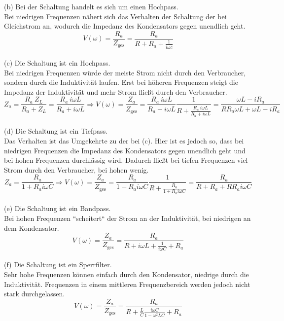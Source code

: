 \documentclass[11pt a4paper]{article}
\begin{document}
(b) Bei der Schaltung handelt es sich um einen Hochpass. \\
Bei niedrigen Frequenzen nähert sich das Verhalten der
Schaltung der bei Gleichstrom an, wodurch die Impedanz des Kondensators gegen unendlich geht.
\[ V(\omega) = \frac{R_a}{Z_\text{ges}} = \frac{R_a}{R + R_a + \frac{1}{i\omega c}} \]
\\

(c) Die Schaltung ist ein Hochpass. \\
Bei niedrigen Frequenzen würde der meiste Strom nicht durch den Verbraucher, sondern durch die Induktivität laufen.
Erst bei höheren Frequenzen steigt die Impedanz der Induktivität und mehr Strom fließt durch den Verbraucher.
\[
	Z_a = \frac{R_a \ Z_L}{R_a + Z_L} = \frac{R_a \ i\omega L}{R_a + i\omega L} 
	\Rightarrow 
	V(\omega) = \frac{Z_a}{Z_\text{ges}} 
	= \frac{R_a \ i\omega L}{R_a + i\omega L} \frac{1}{R + \frac{R_a \ i\omega L}{R_a + i\omega L}}
	= \frac{\omega L - iR_a}{R R_a \omega L + \omega L - iR_a}
\]
\\

(d) Die Schaltung ist ein Tiefpass. \\
Das Verhalten ist das Umgekehrte zu der bei (c). Hier ist es jedoch so, dass bei niedrigen Frequenzen die Impedanz
des Kondensators gegen unendlich geht und bei hohen Frequenzen durchlässig wird. Dadurch fließt bei tiefen
Frequenzen viel Strom durch den Verbraucher, bei hohen wenig.
\[
	Z_a = \frac{R_a}{1 + R_a i\omega C}
	\Rightarrow 
	V(\omega) = \frac{Z_a}{Z_\text{ges}} 
	= \frac{R_a}{1 + R_a i\omega C} \frac{1}{R + \frac{R_a}{1 + R_a i\omega C}}
	= \frac{R_a}{R + R_a + RR_a i\omega C}
\]
\\

(e) Die Schaltung ist ein Bandpass. \\
Bei hohen Frequenzen ``scheitert`` der Strom an der Induktivität, bei niedrigen an dem Kondensator.
\[
	V(\omega) = \frac{Z_a}{Z_\text{ges}} = \frac{R_a}{R + i\omega L + \frac{1}{i \omega C} + R_a}
\]
\\

(f) Die Schaltung ist ein Sperrfilter. \\
Sehr hohe Frequenzen können einfach durch den Kondensator, niedrige durch die Induktivität. Frequenzen in einem
mittleren Frequenzbereich werden jedoch nicht stark durchgelassen.
\[
	V(\omega) = \frac{Z_a}{Z_\text{ges}} 
	= \frac{R_a}{R + \frac{L}{C} \frac{i\omega C}{1 - \omega^2 LC} + R_a}
\]
\end{document}
